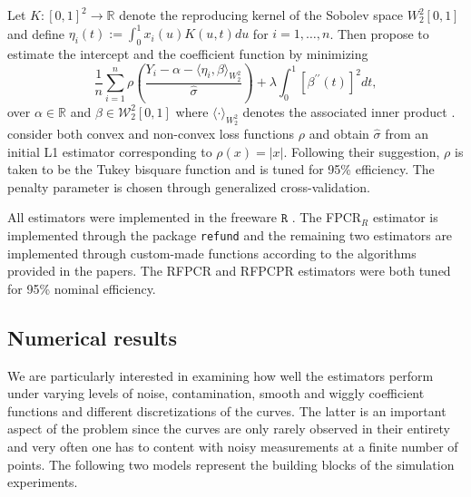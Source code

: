 \documentclass[11pt]{article}
\begin{document}
Let $K:[0,1]^2 \to \mathbb{R}$ denote the reproducing kernel of the Sobolev space $W^2_2[0,1]$ and define $\eta_i(t) := \int_{0}^1 x_i(u) K(u,t) du$ for $i=1, \ldots, n$. Then \cite{shin2016rkhs} propose to estimate the intercept and the coefficient function by minimizing
\begin{equation}
\label{eq:41}
\frac{1}{n} \sum_{i=1}^n \rho \left( \frac{Y_i - \alpha - \langle \eta_i, \beta \rangle_{W_2^2} }{\widehat{\sigma}} \right) + \lambda \int_{0}^1 \left[\beta^{\prime \prime}(t)\right]^2 dt,
\end{equation}
over $\alpha \in \mathbb{R}$ and $\beta \in \mathcal{W}^2_2 [0,1]$ where $\langle \cdot \rangle_{W^2_2}$ denotes the associated inner product \citep{hsing2015theoretical}. \cite{shin2016rkhs} consider both convex and non-convex loss functions $\rho$ and obtain $\widehat{\sigma}$ from an initial L1 estimator corresponding to $\rho(x) = |x|$. Following their suggestion, $\rho$ is taken to be the Tukey bisquare function and is tuned for 95\% efficiency. The penalty parameter is chosen through generalized cross-validation.

All estimators were implemented in the freeware $\texttt{R}$ \citep{R}. The FPCR$_R$ estimator is implemented through the package \texttt{refund} \citep{refund} and the remaining two estimators are implemented through custom-made functions according to the algorithms provided in the papers. The RFPCR and RFPCPR estimators were both tuned for 95\% nominal efficiency.

\subsection{Numerical results}

We are particularly interested in examining how well the estimators perform under varying levels of noise, contamination, smooth and wiggly coefficient functions and different discretizations of the curves. The latter is an important aspect of the problem since the curves are only rarely observed in their entirety and very often one has to content with noisy measurements at a finite number of points. The following two models represent the building blocks of the simulation experiments.
\end{document}
